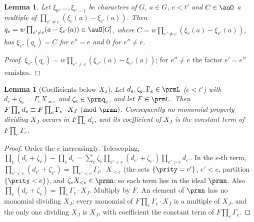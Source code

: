 \documentclass[10pt]{amsart}
\newtheorem{lemma}[theorem]{Lemma}
\theoremstyle{definition}
\theoremstyle{remark}
\begin{document}
\begin{lemma}\label{prm:sep}
Let $\xi_0,\dots,\xi_{t'-1}$ be characters of $G$, $a\in G$, $e<t'$ and $C\in\auO$ a multiple of
$\prod_{e'\ne e}(\xi_e(a)-\xi_{e'}(a))$. Then $q_e=w\prod_{e'\ne e}(a-\xi_{e'}(a))\in\auO[G]$, where
$C=w\prod_{e'\ne e}(\xi_e(a)-\xi_{e'}(a))$, has $\xi_{e''}(q_e)=C$ for $e''=e$ and $0$ for $e''\ne e$.
\end{lemma}
\begin{proof}
$\xi_{e''}(q_e)=w\prod_{e'\ne e}(\xi_{e''}(a)-\xi_{e'}(a))$; for $e''\ne e$ the factor $e'=e''$ vanishes.
\end{proof}

\begin{lemma}[Coefficients below $X_J$]\label{prm:coeff}
Let $d_e,\zeta_e,\Gamma_e\in\prmL$ ($e<t'$) with $d_e+\zeta_e=\Gamma_eX_{=e}$ and $\zeta_e\in\prmq_e$,
and let $F\in\prmL$. Then $F\prod_ed_e\equiv F\prod_e\Gamma_e\cdot X_J\pmod\prmn$. Consequently no
monomial properly dividing $X_J$ occurs in $F\prod_ed_e$, and its coefficient of $X_J$ is the constant
term of $F\prod_e\Gamma_e$.
\end{lemma}
\begin{proof}
Order the $e$ increasingly. Telescoping, $\prod_e(d_e+\zeta_e)-\prod_ed_e=\sum_e\zeta_e\prod_{e'<e}(d_{e'}+
\zeta_{e'})\prod_{e'>e}d_{e'}$. In the $e$-th term, $\prod_{e'<e}(d_{e'}+\zeta_{e'})=\prod_{e'<e}
\Gamma_{e'}\cdot X_{<e}$ (the sets $\{\prity=e'\}$, $e'<e$, partition $\{\prity<e\}$), and $\zeta_eX_{<e}
\in\prmn$; so each term lies in the ideal $\prmn$. Also $\prod_e(d_e+\zeta_e)=\prod_e\Gamma_e\cdot X_J$.
Multiply by $F$. An element of $\prmn$ has no monomial dividing $X_J$; every monomial of $F\prod_e
\Gamma_e\cdot X_J$ is a multiple of $X_J$, and the only one dividing $X_J$ is $X_J$, with coefficient the
constant term of $F\prod_e\Gamma_e$.
\end{proof}
\end{document}
